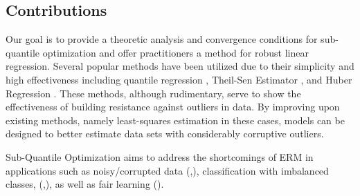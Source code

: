\documentclass{article} %
\begin{document}
	\subsection{Contributions}
	Our goal is to provide a theoretic analysis and convergence conditions for sub-quantile optimization and offer practitioners a method for robust linear regression.
	Several popular methods have been utilized due to their simplicity and high effectiveness including quantile regression \cite{quantile-regression}, Theil-Sen Estimator \cite{thiel-sen}, and Huber Regression \cite{Huber2009}. These methods, although rudimentary, serve to show the effectiveness of building resistance against outliers in data. By improving upon existing methods, namely least-squares estimation in these cases, models can be designed to better estimate data sets with considerably corruptive outliers.
	
	Sub-Quantile Optimization aims to address the shortcomings of ERM in applications such as noisy/corrupted data (\cite{khetan2018learning},\cite{jiang2018mentornet}), classification with imbalanced classes, (\cite{lin2017dense},\cite{he2009imbalanced}), as well as fair learning (\cite{Corbett2018fairness}).
	
\end{document}

